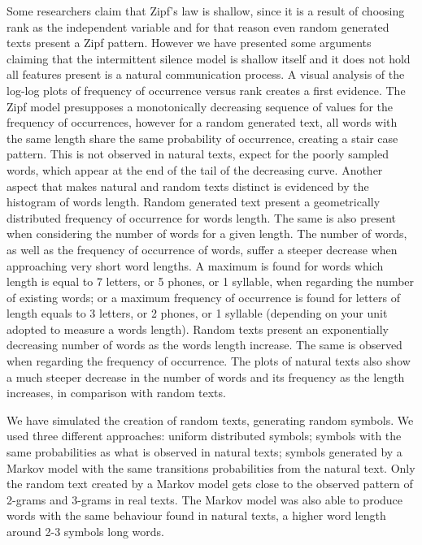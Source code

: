 Some researchers claim that Zipf's law is shallow, since it is a result of choosing 
rank as the independent variable and for that reason even random generated texts present 
a Zipf pattern. However we have presented some arguments claiming that the intermittent silence
model is shallow itself and it does not hold all features present is a natural communication
process. A visual analysis of the log-log plots of frequency of occurrence versus rank creates
a first evidence. The Zipf model presupposes a monotonically decreasing sequence of values
for the frequency of occurrences, however for a random generated text, all words with the 
same length share the same probability of occurrence, creating a stair case pattern.
This is not observed in natural texts, expect for the poorly sampled words, which
appear at the end of the tail of the decreasing curve.
Another aspect that makes natural and random texts distinct is evidenced by
the histogram of words length. 
Random generated text present a geometrically distributed frequency of occurrence
for words length. The same is also present when considering the number of words for a given length.
The number of words, as well as the frequency of occurrence of words, suffer a 
steeper decrease when approaching very short word lengths. A maximum is found for words
which length is equal to 7 letters, or 5 phones, or 1 syllable, when regarding the
number of existing words; or a maximum frequency of occurrence is found for letters 
of length equals to 3 letters, or 2 phones, or 1 syllable (depending on your unit
adopted to measure a words length). Random texts present an exponentially decreasing
number of words as the words length increase. The same is observed when regarding 
the frequency of occurrence. The plots of natural texts also show a much steeper 
decrease in the number of words and its frequency as the length increases, in comparison 
with random texts. 

We have simulated the creation of random texts, generating random symbols. We used 
three different approaches: uniform distributed symbols; symbols with the same
probabilities as what is observed in natural texts; symbols generated by a Markov
model with the same transitions probabilities from the natural text. Only the
random text created by a Markov model gets close to the observed pattern of
2-grams and 3-grams in real texts. The Markov model was also able to produce
words with the same behaviour found in natural texts, a higher word length around
2-3 symbols long words.

